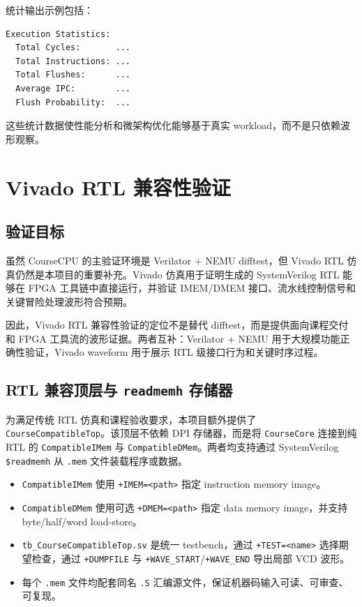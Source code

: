 \documentclass[UTF8,a4paper,12pt]{ctexrep}
\begin{document}
统计输出示例包括：

\begin{lstlisting}[language={}]
Execution Statistics:
  Total Cycles:       ...
  Total Instructions: ...
  Total Flushes:      ...
  Average IPC:        ...
  Flush Probability:  ...
\end{lstlisting}

这些统计数据使性能分析和微架构优化能够基于真实 workload，而不是只依赖波形观察。

\chapter{Vivado RTL 兼容性验证}

\section{验证目标}

虽然 CourseCPU 的主验证环境是 Verilator + NEMU difftest，但 Vivado RTL 仿真仍然是本项目的重要补充。Vivado 仿真用于证明生成的 SystemVerilog RTL 能够在 FPGA 工具链中直接运行，并验证 IMEM/DMEM 接口、流水线控制信号和关键冒险处理波形符合预期。

因此，Vivado RTL 兼容性验证的定位不是替代 difftest，而是提供面向课程交付和 FPGA 工具流的波形证据。两者互补：Verilator + NEMU 用于大规模功能正确性验证，Vivado waveform 用于展示 RTL 级接口行为和关键时序过程。

\section{RTL 兼容顶层与 \texttt{readmemh} 存储器}

为满足传统 RTL 仿真和课程验收要求，本项目额外提供了 \texttt{CourseCompatibleTop}。该顶层不依赖 DPI 存储器，而是将 \texttt{CourseCore} 连接到纯 RTL 的 \texttt{CompatibleIMem} 与 \texttt{CompatibleDMem}。两者均支持通过 SystemVerilog \texttt{\$readmemh} 从 \texttt{.mem} 文件装载程序或数据。

\begin{itemize}
  \item \texttt{CompatibleIMem} 使用 \texttt{+IMEM=<path>} 指定 instruction memory image。
  \item \texttt{CompatibleDMem} 使用可选 \texttt{+DMEM=<path>} 指定 data memory image，并支持 byte/half/word load-store。
  \item \texttt{tb\_CourseCompatibleTop.sv} 是统一 testbench，通过 \texttt{+TEST=<name>} 选择期望检查，通过 \texttt{+DUMPFILE} 与 \texttt{+WAVE\_START}/\texttt{+WAVE\_END} 导出局部 VCD 波形。
  \item 每个 \texttt{.mem} 文件均配套同名 \texttt{.S} 汇编源文件，保证机器码输入可读、可审查、可复现。
\end{itemize}
\end{document}
